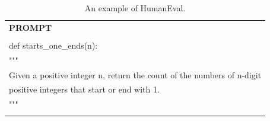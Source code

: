\begin{table}[h]
    \centering \small
\begin{tabular}{p{12cm}}
\toprule
\textbf{PROMPT}\\
\\def starts\_one\_ends(n):
\\    """
\\    Given a positive integer n, return the count of the numbers of n-digit
\\    positive integers that start or end with 1.
\\    """
\\\\
\bottomrule
\end{tabular}
    \caption{\centering An example of HumanEval.}
    \label{tab:humaneval_eval_format_example}
\end{table}

